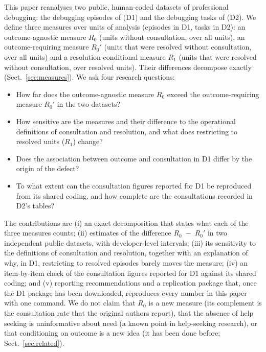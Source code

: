 \documentclass[pdflatex,sn-basic]{sn-jnl}
\newcommand{\Rz}{\ensuremath{R_0}}
\newcommand{\Rzp}{\ensuremath{R_0'}}
\newcommand{\Ro}{\ensuremath{R_1}}
\begin{document}
This paper reanalyses two public, human-coded datasets of professional debugging: the debugging episodes of \citet{alaboudi2021,alaboudi2023} (D1) and the debugging tasks of \citet{li2026} (D2). We define three measures over units of analysis (episodes in D1, tasks in D2): an outcome-agnostic measure \Rz{} (units without consultation, over all units), an outcome-requiring measure \Rzp{} (units that were resolved without consultation, over all units) and a resolution-conditional measure \Ro{} (units that were resolved without consultation, over resolved units). Their differences decompose exactly (Sect.~\ref{sec:measures}). We ask four research questions:

\begin{itemize}
\item[\textbf{RQ1}] How far does the outcome-agnostic measure \Rz{} exceed the outcome-requiring measure \Rzp{} in the two datasets?
\item[\textbf{RQ2}] How sensitive are the measures and their difference to the operational definitions of consultation and resolution, and what does restricting to resolved units (\Ro) change?
\item[\textbf{RQ3}] Does the association between outcome and consultation in D1 differ by the origin of the defect?
\item[\textbf{RQ4}] To what extent can the consultation figures reported for D1 be reproduced from its shared coding, and how complete are the consultations recorded in D2's tables?
\end{itemize}

The contributions are (i) an exact decomposition that states what each of the three measures counts; (ii) estimates of the difference \Rz{}~$-$~\Rzp{} in two independent public datasets, with developer-level intervals; (iii) its sensitivity to the definitions of consultation and resolution, together with an explanation of why, in D1, restricting to resolved episodes barely moves the measure; (iv) an item-by-item check of the consultation figures reported for D1 against its shared coding; and (v) reporting recommendations and a replication package that, once the D1 package has been downloaded, reproduces every number in this paper with one command. We do not claim that \Rz{} is a new measure (its complement is the consultation rate that the original authors report), that the absence of help seeking is uninformative about need (a known point in help-seeking research), or that conditioning on outcome is a new idea (it has been done before; Sect.~\ref{sec:related}).
\end{document}
